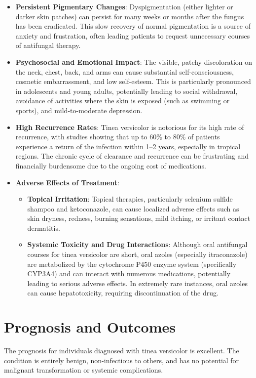 \begin{itemize}
    \item \textbf{Persistent Pigmentary Changes}: Dyspigmentation (either lighter or darker skin patches) can persist for many weeks or months after the fungus has been eradicated. This slow recovery of normal pigmentation is a source of anxiety and frustration, often leading patients to request unnecessary courses of antifungal therapy.
    \item \textbf{Psychosocial and Emotional Impact}: The visible, patchy discoloration on the neck, chest, back, and arms can cause substantial self-consciousness, cosmetic embarrassment, and low self-esteem. This is particularly pronounced in adolescents and young adults, potentially leading to social withdrawal, avoidance of activities where the skin is exposed (such as swimming or sports), and mild-to-moderate depression.
    \item \textbf{High Recurrence Rates}: Tinea versicolor is notorious for its high rate of recurrence, with studies showing that up to 60\% to 80\% of patients experience a return of the infection within 1--2 years, especially in tropical regions. The chronic cycle of clearance and recurrence can be frustrating and financially burdensome due to the ongoing cost of medications.
    \item \textbf{Adverse Effects of Treatment}:
    \begin{itemize}
        \item \textbf{Topical Irritation}: Topical therapies, particularly selenium sulfide shampoo and ketoconazole, can cause localized adverse effects such as skin dryness, redness, burning sensations, mild itching, or irritant contact dermatitis.
        \item \textbf{Systemic Toxicity and Drug Interactions}: Although oral antifungal courses for tinea versicolor are short, oral azoles (especially itraconazole) are metabolized by the cytochrome P450 enzyme system (specifically CYP3A4) and can interact with numerous medications, potentially leading to serious adverse effects. In extremely rare instances, oral azoles can cause hepatotoxicity, requiring discontinuation of the drug.
    \end{itemize}
\end{itemize}

\section*{Prognosis and Outcomes}
The prognosis for individuals diagnosed with tinea versicolor is excellent. The condition is entirely benign, non-infectious to others, and has no potential for malignant transformation or systemic complications.

